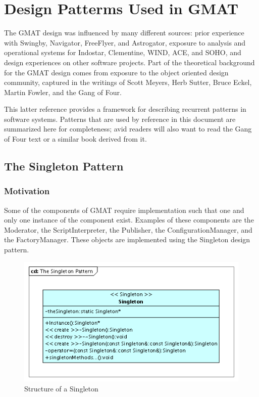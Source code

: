 \chapter{\label{chapter:Patterns}Design Patterms Used in GMAT}

The GMAT design was influenced by many different sources: prior experience with Swingby, Navigator,
FreeFlyer, and Astrogator, exposure to analysis and operational systems for Indostar, Clementine,
WIND, ACE, and SOHO, and design experiences on other software projects.  Part of the theoretical
background for the GMAT design comes from exposure to the object oriented design community,
captured in the writings of Scott Meyers, Herb Sutter, Bruce Eckel, Martin Fowler, and the Gang of
Four\cite{GoF}.

This latter reference provides a framework for describing recurrent patterns in software systems.
Patterns that are used by reference in this document are summarized here for completeness; avid
readers will also want to read the Gang of Four text or a similar book derived from it.

\section{\label{section:TheSingletonPattern}The Singleton Pattern}

\subsection{Motivation}
Some of the components of GMAT require implementation such that one and only one instance of the
component exist.  Examples of these components are the Moderator, the ScriptInterpreter, the
Publisher, the ConfigurationManager, and the FactoryManager.  These objects are implemented using
the Singleton design pattern.

\begin{figure}[htb]
\begin{center}
\includegraphics[232,130]{Images/TheSingletonPattern.png}
\caption{\label{figure:TheSingletonPattern}Structure of a Singleton}
\end{center}
\end{figure}

